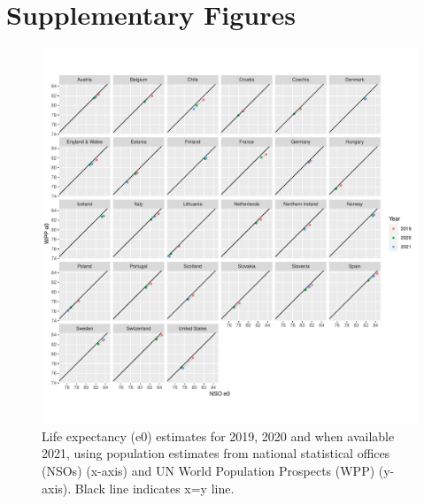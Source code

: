 \documentclass[12pt]{article}
\begin{document}
\clearpage

\section*{Supplementary Figures}

\begin{figure}[ht!]
    \centering
    \includegraphics[width=\textwidth]{figure-s1.pdf}
    \caption{Life expectancy (e0) estimates for 2019, 2020 and when available 2021, using population estimates from national statistical offices (NSOs) (x-axis) and UN World Population Prospects (WPP) (y-axis). Black line indicates x=y line.}
    \label{fig:figure-a8}
\end{figure}
\end{document}
